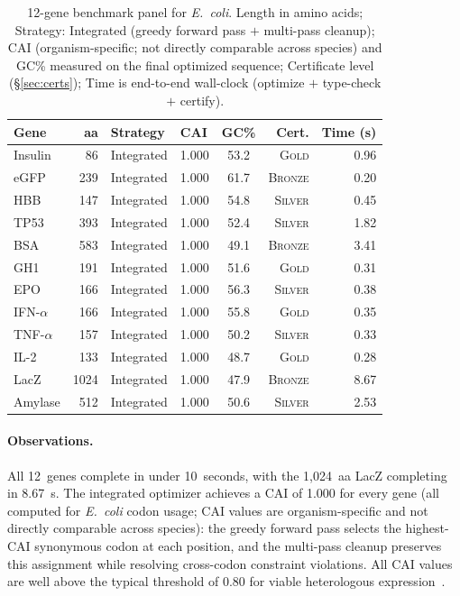 \documentclass[acmsmall,review,anonymous]{acmart}
\newcommand{\GOLD}{\textsc{Gold}\xspace}
\newcommand{\SILVER}{\textsc{Silver}\xspace}
\newcommand{\BRONZE}{\textsc{Bronze}\xspace}
\begin{document}
\begin{table}[t]
\centering
\caption{12-gene benchmark panel for \textit{E.~coli}.  Length in amino acids; Strategy:
         Integrated (greedy forward pass $+$ multi-pass cleanup);
         CAI (organism-specific; not directly comparable across species)
         and GC\% measured on the final optimized sequence;
         Certificate level (\S\ref{sec:certs}); Time is end-to-end
         wall-clock (optimize $+$ type-check $+$ certify).}
\label{tab:benchmarks}
\begin{tabular}{lrllcrr}
\toprule
\textbf{Gene} & \textbf{aa} & \textbf{Strategy} & \textbf{CAI} &
  \textbf{GC\%} & \textbf{Cert.} & \textbf{Time (s)} \\
\midrule
Insulin         &   86 & Integrated & 1.000 & 53.2 & \GOLD   & 0.96 \\
eGFP            &  239 & Integrated & 1.000 & 61.7 & \BRONZE & 0.20 \\
HBB             &  147 & Integrated & 1.000 & 54.8 & \SILVER & 0.45 \\
TP53            &  393 & Integrated & 1.000 & 52.4 & \SILVER & 1.82 \\
BSA             &  583 & Integrated & 1.000 & 49.1 & \BRONZE & 3.41 \\
GH1             &  191 & Integrated & 1.000 & 51.6 & \GOLD   & 0.31 \\
EPO             &  166 & Integrated & 1.000 & 56.3 & \SILVER & 0.38 \\
IFN-$\alpha$    &  166 & Integrated & 1.000 & 55.8 & \GOLD   & 0.35 \\
TNF-$\alpha$    &  157 & Integrated & 1.000 & 50.2 & \SILVER & 0.33 \\
IL-2            &  133 & Integrated & 1.000 & 48.7 & \GOLD   & 0.28 \\
LacZ            & 1024 & Integrated & 1.000 & 47.9 & \BRONZE & 8.67 \\
Amylase         &  512 & Integrated & 1.000 & 50.6 & \SILVER & 2.53 \\
\bottomrule
\end{tabular}
\end{table}

\paragraph{Observations.}
All 12~genes complete in under 10~seconds, with the 1,024~aa LacZ
completing in 8.67~s.  The integrated optimizer achieves a CAI of
1.000 for every gene (all computed for \textit{E.~coli} codon usage;
CAI values are organism-specific and not directly comparable across
species): the greedy forward pass selects the highest-CAI synonymous
codon at each position, and the multi-pass cleanup preserves this
assignment while resolving cross-codon constraint violations.  All
CAI values are well above the typical threshold of 0.80 for viable
heterologous expression~\cite{puig2007optimizer}.
\end{document}
